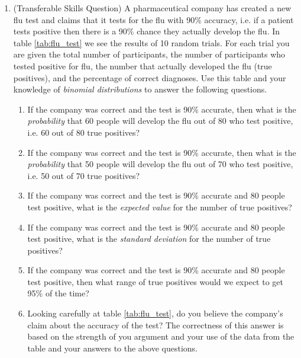 \documentclass[12pt,twoside]{article}
\begin{document}
\begin{enumerate}
\clearpage

    \item (Transferable Skills Question) A pharmaceutical company has created a new flu test and claims that it tests for the flu with 90\% accuracy, i.e. if a patient tests positive then there is a 90\% chance they actually develop the flu.  In table \ref{tab:flu_test} we see the results of 10 random trials.  For each trial you are given the total number of participants, the number of participants who tested positive for flu, the number that actually developed the flu (true positives), and the percentage of correct diagnoses.  Use this table and your knowledge of \emph{binomial distributions} to answer the following questions.
    \begin{table}[hpbt]
        \centering
        
        \caption{Flue Test Trial Results}
        \label{tab:flu_test}
    \end{table}
    \begin{enumerate}
        \item If the company was correct and the test is 90\% accurate, then what is the \emph{probability} that 60 people will develop the flu out of 80 who test positive, i.e. 60 out of 80 true positives?
        \item If the company was correct and the test is 90\% accurate, then what is the \emph{probability} that 50 people will develop the flu out of 70 who test positive, i.e. 50 out of 70 true positives?
        \item If the company was correct and the test is 90\% accurate and 80 people test positive, what is the \emph{expected value} for the number of true positives?
        \item If the company was correct and the test is 90\% accurate and 80 people test positive, what is the \emph{standard deviation} for the number of true positives?
        \item If the company was correct and the test is 90\% accurate and 80 people test positive, then what range of true positives would we expect to get 95\% of the time?
        \item Looking carefully at table \ref{tab:flu_test}, do you believe the company's claim about the accuracy of the test?  The correctness of this answer is based on the strength of you argument and your use of the data from the table and your answers to the above questions.
    \end{enumerate}
\end{enumerate}
\end{document}
